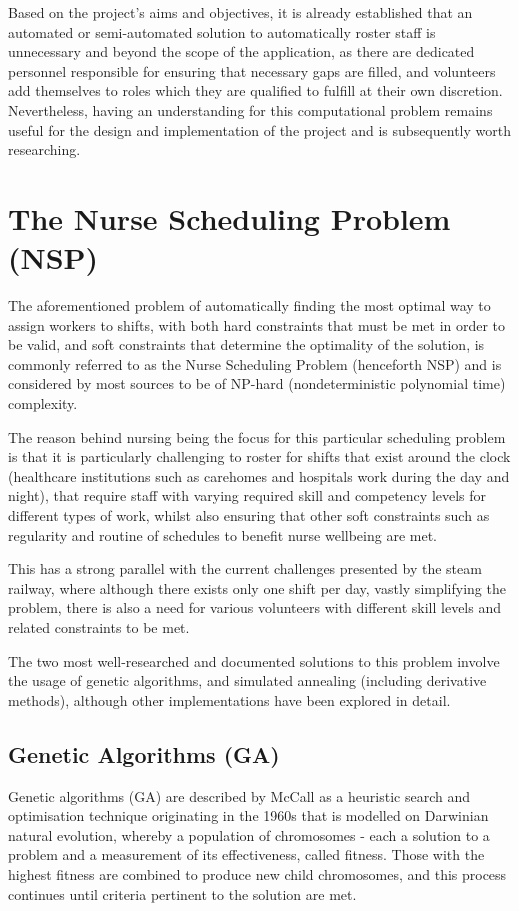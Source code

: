 Based on the project's aims and objectives, it is already established that an automated or semi-automated solution to automatically roster staff is unnecessary and beyond the scope of the application, as there are dedicated personnel responsible for ensuring that necessary gaps are filled, and volunteers add themselves to roles which they are qualified to fulfill at their own discretion. Nevertheless, having an understanding for this computational problem remains useful for the design and implementation of the project and is subsequently worth researching.

\section{The Nurse Scheduling Problem (NSP)}
The aforementioned problem of automatically finding the most optimal way to assign workers to shifts, with both hard constraints that must be met in order to be valid, and soft constraints that determine the optimality of the solution, is commonly referred to as the Nurse Scheduling Problem (henceforth NSP) and is considered by most sources to be of NP-hard (nondeterministic polynomial time) complexity. \cite{Tassopoulos2013} 

The reason behind nursing being the focus for this particular scheduling problem is that it is particularly challenging to roster for shifts that exist around the clock (healthcare institutions such as carehomes and hospitals work during the day and night), that require staff with varying required skill and competency levels for different types of work, whilst also ensuring that other soft constraints such as regularity and routine of schedules to benefit nurse wellbeing are met. \cite{Burke2004}

This has a strong parallel with the current challenges presented by the steam railway, where although there exists only one shift per day, vastly simplifying the problem, there is also a need for various volunteers with different skill levels and related constraints to be met.

The two most well-researched and documented solutions to this problem involve the usage of genetic algorithms, and simulated annealing (including derivative methods), although other implementations have been explored in detail.

\subsection{Genetic Algorithms (GA)}
Genetic algorithms (GA) are described by McCall as a heuristic search and optimisation technique originating in the 1960s that is modelled on Darwinian natural evolution, whereby a population of chromosomes - each a solution to a problem and a measurement of its effectiveness, called fitness. Those with the highest fitness are combined to produce new child chromosomes, and this process continues until criteria pertinent to the solution are met. \cite{MCCALL2005205}

